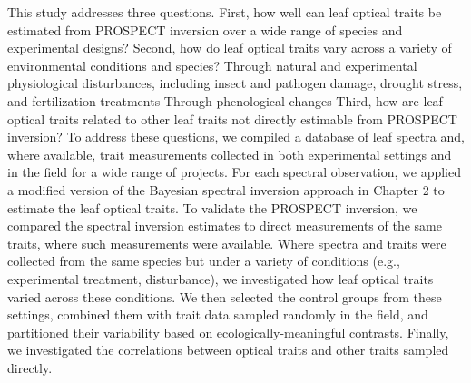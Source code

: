 This study addresses three questions.
First, how well can leaf optical traits be estimated from PROSPECT inversion over a wide range of species and experimental designs?
Second, how do leaf optical traits vary across a variety of environmental conditions and species?
  Through natural and experimental physiological disturbances, including insect and pathogen damage, drought stress, and fertilization treatments
  Through phenological changes
Third, how are leaf optical traits related to other leaf traits not directly estimable from PROSPECT inversion?
To address these questions, we compiled a database of leaf spectra and, where available, trait measurements collected in both experimental settings and in the field for a wide range of projects.
For each spectral observation, we applied a modified version of the Bayesian spectral inversion approach in Chapter 2 to estimate the leaf optical traits.
To validate the PROSPECT inversion, we compared the spectral inversion estimates to direct measurements of the same traits, where such measurements were available.
Where spectra and traits were collected from the same species but under a variety of conditions (e.g., experimental treatment, disturbance), we investigated how leaf optical traits varied across these conditions.
We then selected the control groups from these settings, combined them with trait data sampled randomly in the field, and partitioned their variability based on ecologically-meaningful contrasts.
Finally, we investigated the correlations between optical traits and other traits sampled directly.
